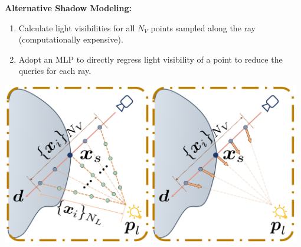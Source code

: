 \documentclass[landscape,a0paper,fontscale=0.292]{baposter}
\begin{document}
\begin{poster}
{    \vspace{0.2em}
    \begin{minipage}[c]{0.54\textwidth}
    \textbf{\color{ctitle}Alternative Shadow Modeling:} 
    \vspace{0.2em}
        \begin{enumerate}[leftmargin=*,nosep,label={(\alph*)}]
            \item Calculate light visibilities for all $N_V$ points sampled along the ray (computationally expensive).
            \item Adopt an MLP to directly regress light visibility of a point to reduce the queries for each ray.
        \end{enumerate}
    \end{minipage}
    \hfill
    \begin{minipage}[c]{0.45\textwidth}
    \begin{center}
        \hfill\includegraphics[width=0.98\textwidth]{images/shadow.pdf}\\
        \vspace{-0.3em}
         \\
    \end{center}
    \end{minipage}
    
}
\end{poster}
\end{document}
